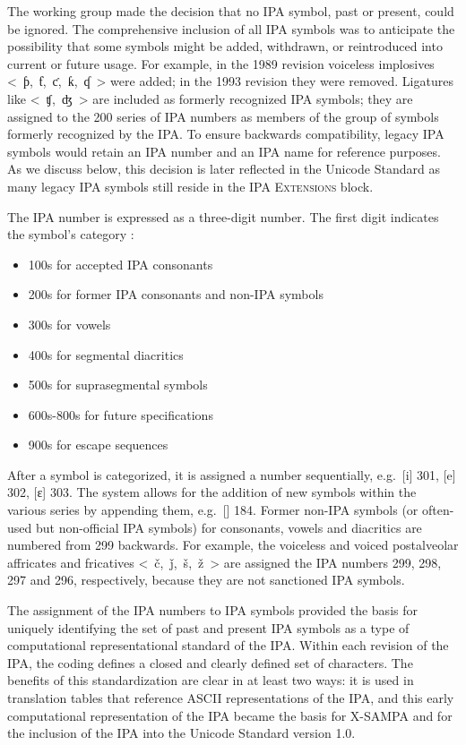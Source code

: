 The working group made the decision that no IPA symbol, past or present, 
could be ignored. The comprehensive inclusion of all IPA symbols was to 
anticipate the possibility that some symbols might be added, withdrawn, 
or reintroduced into current or future usage. For example, in the 1989 
revision voiceless implosives <~ƥ,~ƭ,~ƈ,~ƙ,~ʠ~> were added; in the 1993 
revision they were removed. Ligatures like <~ʧ,~ʤ~> are included as formerly 
recognized IPA symbols; they are assigned to the 200 series of IPA numbers 
as members of the group of symbols formerly recognized by the IPA. To ensure 
backwards compatibility, legacy IPA symbols would retain an IPA number and 
an IPA name for reference purposes. As we discuss below, this decision is 
later reflected in the Unicode Standard as many legacy IPA symbols still reside in 
the \textsc{IPA Extensions} block.

The IPA number is expressed as a three-digit number. The first digit 
indicates the symbol's category \citep{Esling1990,EslingGaylord1993}:

\begin{itemize}
	\item 100s for accepted IPA consonants
	\item 200s for former IPA consonants and non-IPA symbols
	\item 300s for vowels
	\item 400s for segmental diacritics
	\item 500s for suprasegmental symbols
	\item 600s-800s for future specifications
	\item 900s for escape sequences
\end{itemize}

After a symbol is categorized, it is assigned a number sequentially, e.g.\ [i]
301, [e] 302, [ɛ] 303. The system allows for the addition of new symbols within
the various series by appending them, e.g.\ [] 184. Former non-IPA
symbols (or often-used but non-official IPA symbols) for consonants, vowels and
diacritics are numbered from 299 backwards. For example, the voiceless and
voiced postalveolar affricates and fricatives <~č,~ǰ,~š,~ž~> are assigned the
IPA numbers 299, 298, 297 and 296, respectively, because they are not sanctioned
IPA symbols.

The assignment of the IPA numbers to IPA symbols provided the basis for uniquely
identifying the set of past and present IPA symbols as a type of computational
representational standard of the IPA. Within each revision of the IPA, the
coding defines a closed and clearly defined set of characters. The benefits of
this standardization are clear in at least two ways: it is used in translation
tables that reference ASCII representations of the IPA, and this early
computational representation of the IPA became the basis for X-SAMPA and for the
inclusion of the IPA into the Unicode Standard version 1.0.

